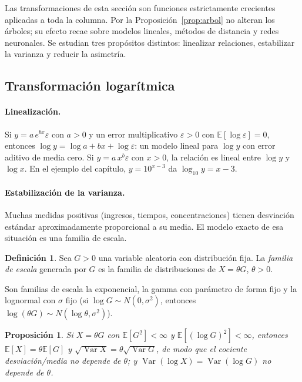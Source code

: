 \documentclass[11pt,a4paper]{article}
\theoremstyle{plain}
\newtheorem{proposicion}[teorema]{Proposición}
\theoremstyle{definition}
\newtheorem{definicion}[teorema]{Definición}
\theoremstyle{remark}
\newcommand{\E}{\mathbb{E}}
\newcommand{\Var}{\operatorname{Var}}
\newcommand{\1}{\mathbf{1}}
\begin{document}
Las transformaciones de esta sección son funciones estrictamente
crecientes aplicadas a toda la columna. Por la
Proposición~\ref{prop:arbol} no alteran los árboles; su efecto recae sobre
modelos lineales, métodos de distancia y redes neuronales. Se estudian tres
propósitos distintos: linealizar relaciones, estabilizar la varianza y
reducir la asimetría.

\subsection{Transformación logarítmica}\label{sec:log}

\paragraph{Linealización.} Si $y=a\,e^{bx}\varepsilon$ con $a>0$ y un
error multiplicativo $\varepsilon>0$ con $\E[\log\varepsilon]=0$, entonces
$\log y=\log a+bx+\log\varepsilon$: un modelo lineal para $\log y$ con
error aditivo de media cero. Si $y=a\,x^b\varepsilon$ con $x>0$, la
relación es lineal entre $\log y$ y $\log x$. En el ejemplo del capítulo,
$y=10^{x-3}$ da $\log_{10}y=x-3$.

\paragraph{Estabilización de la varianza.} Muchas medidas positivas
(ingresos, tiempos, concentraciones) tienen desviación estándar
aproximadamente proporcional a su media. El modelo exacto de esa situación
es una familia de escala.

\begin{definicion}
Sea $G>0$ una variable aleatoria con distribución fija. La \emph{familia de
escala} generada por $G$ es la familia de distribuciones de $X=\theta G$,
$\theta>0$.
\end{definicion}

Son familias de escala la exponencial, la gamma con parámetro de forma fijo
y la lognormal con $\sigma$ fijo (si $\log G\sim N(0,\sigma^2)$, entonces
$\log(\theta G)\sim N(\log\theta,\sigma^2)$).

\begin{proposicion}\label{prop:escala}
Si $X=\theta G$ con $\E[G^2]<\infty$ y $\E[(\log G)^2]<\infty$, entonces
$\E[X]=\theta\E[G]$ y $\sqrt{\Var X}=\theta\sqrt{\Var G}$, de modo que el
cociente desviación/media no depende de $\theta$; y
$\Var(\log X)=\Var(\log G)$ no depende de $\theta$.
\end{proposicion}
\end{document}
